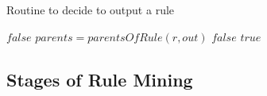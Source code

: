 \begin{algorithm}
\caption{Routine to decide to output a rule}
\label{pfo}
\begin{algorithmic}[1]
      \State \Return $false$
    \EndIf 
    \State $parents = parentsOfRule(r, out)$
	\State \Return $false$
      \EndIf
    \EndFor
    \State \Return $true$
\EndFunction
\end{algorithmic}
\end{algorithm}




\subsection{Stages of Rule Mining}

